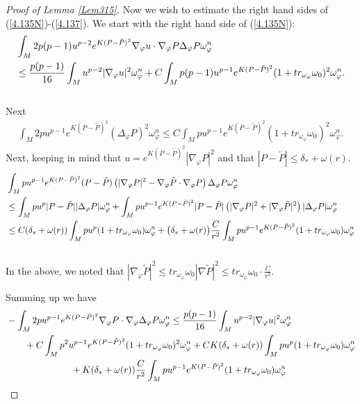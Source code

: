 \documentclass[11pt]{amsart}
\numberwithin{equation}{section}
\begin{document}
\begin{proof}[Proof of Lemma \ref{Lem315}]
Now we wish to estimate the right hand sides of (\ref{4.135N})-(\ref{4.137}).
We start with the right hand side of (\ref{4.135N}):
\begin{align}
	&\int_M2p(p-1)u^{p-2}e^{K(P-\tilde P)^2}\nabla_{\varphi}u\cdot \nabla_{\varphi}P\Delta_{\varphi}P\omega_{\varphi}^n \notag \\
	&\le  \frac{p(p-1)}{16}\int_Mu^{p-2}|\nabla_{\varphi}u|^2\omega_{\varphi}^n + C \int_M p(p-1)u^{p-1}e^{K(P-\tilde P)^2}(1+tr_{\omega_{\varphi}}\omega_0)^2\omega_{\varphi}^n.
\end{align}\\
Next
\begin{align}
	\int_M2pu^{p-1}e^{K(P-\tilde P)^2}(\Delta_{\varphi}P)^2\omega_{\varphi}^n\le  C \int_M pu^{p-1}e^{K(P-\tilde P)^2}(1+tr_{\omega_{\varphi}}\omega_0)^2\omega_{\varphi}^n.
\end{align}
Next,  keeping in mind that $u=e^{K(P-\tilde{P})^2}|\nabla_{\varphi}P|^2$ and that $|P-\tilde{P}|\le \delta_*+\omega(r)$.
\begin{align}
	&\int_M pu^{p-1}e^{K(P-\tilde P)^2} (P-\tilde P)\left( |\nabla_{\varphi}P|^2-\nabla_\varphi\tilde P\cdot\nabla_\varphi P \right) \Delta_{\varphi}P\omega_{\varphi}^n \notag\\
	& \le  \int_M pu^p |P-\tilde P||\Delta_\varphi P|\omega_\varphi^n + \int_M pu^{p-1}e^{K(P-\tilde P)^2} |P-\tilde P|\left( |\nabla_{\varphi}P|^2 +|\nabla_\varphi\tilde P|^2 \right) |\Delta_{\varphi}P| \omega_{\varphi}^n \notag\\
	&  \le  C(\delta_*+\omega(r)) \int_M pu^p  (1+tr_{\omega_{\varphi}}\omega_0)\omega_\varphi^n + \big(\delta_*+\omega(r)\big)\frac{C}{r^2} \int_M pu^{p-1} e^{K(P-\tilde P)^2}(1+tr_{\omega_{\varphi}}\omega_0)\omega_\varphi^n 
\end{align}\\

In the above,  we noted that $|\nabla_{\varphi}\tilde{P}|^2\le tr_{\omega_{\varphi}}\omega_0|\nabla \tilde{P}|^2\le tr_{\omega_{\varphi}}\omega_0\cdot \frac{C}{r^2}$.

Summing up we have 
\begin{align}\label{4.142}
	& -\int_M2pu^{p-1}e^{K(P-\tilde P)^2}\nabla_{\varphi}P\cdot \nabla_{\varphi}\Delta_{\varphi}P\omega_{\varphi}^n \le  \frac{p(p-1)}{16}\int_Mu^{p-2}|\nabla_{\varphi}u|^2\omega_{\varphi}^n \notag\\
	&\quad\quad + C \int_M p^2u^{p-1}e^{K(P-\tilde P)^2}(1+tr_{\omega_{\varphi}}\omega_0)^2\omega_{\varphi}^n +CK(\delta_*+\omega(r)) \int_M pu^p  (1+tr_{\omega_{\varphi}}\omega_0)\omega_\varphi^n \notag\\
	&\quad\quad\quad\quad\quad\quad\quad + K(\delta_*+\omega(r))\frac{C}{r^2} \int_M pu^{p-1} e^{K(P-\tilde P)^2}(1+tr_{\omega_{\varphi}}\omega_0)\omega_\varphi^n 
\end{align}


\end{proof}
\end{document}
